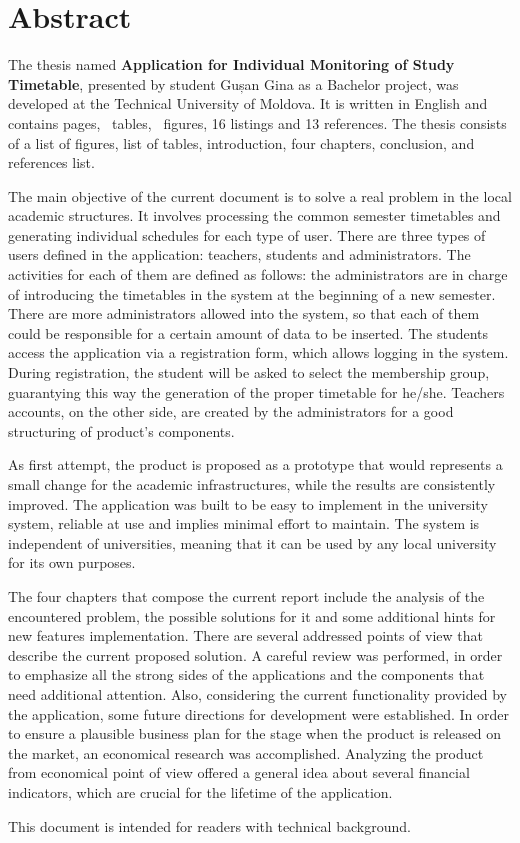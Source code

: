 \section*{Abstract}
The thesis named \textbf{Application for Individual Monitoring of Study Timetable}, presented by student Gușan Gina as a Bachelor project, was developed at the Technical University of Moldova. It is written in English and contains \pageref{LastPage} pages, \totaltables\ tables, \totalfigures\ figures, 16 listings and 13 references. The thesis consists of a list of figures, list of tables, introduction, four chapters, conclusion, and references list.

The main objective of the current document is to solve a real problem in the local academic structures. It involves processing the common semester timetables and generating individual schedules for each type of user.  There are three types of users defined in the application: teachers, students and administrators. The activities for each of them are defined as follows: the administrators are in charge of introducing the timetables in the system at the beginning of a new semester. There are more administrators allowed into the system, so that each of them could be responsible for a certain amount of data to be inserted. The students access the application via a registration form, which allows logging in the system. During registration, the student will be asked to select the membership group, guarantying this way the generation of the proper timetable for he/she. Teachers accounts, on the other side, are created by the administrators for a good structuring of product's components.

As first attempt, the product is proposed as a prototype that would represents a small change for the academic infrastructures, while the results are consistently improved. The application was built to be easy to implement in the university system, reliable at use and implies minimal effort to maintain. The system is independent of universities, meaning that it can be used by any local university for its own purposes.

The four chapters that compose the current report include the analysis of the encountered problem, the possible solutions for it and some additional hints for new features implementation. There are several addressed points of view that describe the current proposed solution. A careful review was performed, in order to emphasize all the strong sides of the applications and the components that need additional attention. Also, considering the current functionality provided by the application, some future directions for development were established. In order to ensure a plausible business plan for the stage when the product is released on the market, an economical research was accomplished. Analyzing the product from economical point of view offered a general idea about several financial indicators, which are crucial for the lifetime of the application.

This document is intended for readers with technical background.


